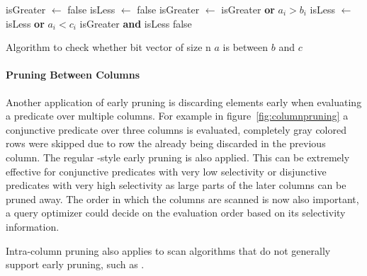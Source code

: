 \begin{algorithm}[h]
\begin{algorithmic}[1]
    \State isGreater $\gets$ false
    \State isLess $\gets$ false
      \State isGreater $\gets$ isGreater \textbf{or} $a_i > b_i$
      \State isLess $\gets$ isLess \textbf{or} $a_i < c_i$
        \State \Return isGreater \textbf{and} isLess
      \EndIf
    \EndFor
    \State \Return false
  \EndProcedure
\end{algorithmic}
\caption{Algorithm to check whether bit vector of size n $a$ is between $b$ and $c$}
\label{algo:between}
\end{algorithm}

\paragraph{Pruning Between Columns}

Another application of early pruning is discarding elements early when
evaluating a predicate over multiple columns. For example in
figure~\ref{fig:columnpruning} a conjunctive predicate over three columns is
evaluated, completely gray colored rows were skipped due to row the already being
discarded in the previous column. The regular \bwv{}-style early pruning is
also applied. This can be extremely effective for conjunctive predicates with
very low selectivity or disjunctive predicates with very high selectivity as
large parts of the later columns can be pruned away.  The order in which the
columns are scanned is now also important, a query optimizer could decide on the
evaluation order based on its selectivity information.

Intra-column pruning also applies to scan algorithms that do not generally
support early pruning, such as \simdscan{}.


